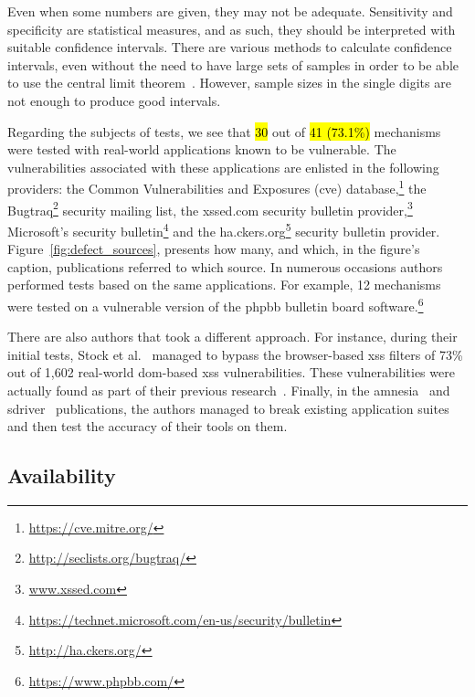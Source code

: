\documentclass[10pt,journal,compsoc]{IEEEtran}
\newcommand{\hlc}[2][yellow]{ {\sethlcolor{#1} \hl{#2}} }
\begin{document}
Even when some numbers are given, they may not be adequate.
Sensitivity and specificity are statistical measures, and as such,
they should be interpreted with suitable confidence intervals. There are
various methods to calculate confidence intervals, even without
the need to have large sets of samples in order to be able to use the
central limit theorem~\cite{brown2001}.
However, sample sizes in the single
digits are not enough to produce good intervals.

Regarding the subjects of tests,
we see that \hlc[yellow]{30} out of \hlc[yellow]{41 (73.1\%)}
mechanisms were tested with real-world
applications known to be vulnerable.
The vulnerabilities associated with these applications
are enlisted in the following providers: the Common
Vulnerabilities and Exposures ({\sc cve})
database,\footnote{\scriptsize\url{https://cve.mitre.org/}}
the Bugtraq\footnote{\scriptsize\url{http://seclists.org/bugtraq/}}
security mailing list,
the {\sc xss}ed.com
security bulletin provider,\footnote{\scriptsize\url{www.xssed.com}}
Microsoft's security
bulletin\footnote{\scriptsize\url{https://technet.microsoft.com/en-us/security/bulletin}}
and the
ha.ckers.org\footnote{\scriptsize\url{http://ha.ckers.org/}}
security bulletin provider.
Figure~\ref{fig:defect_sources},
presents how many,
and which, in the figure's caption, publications referred
to which source.
In numerous occasions authors performed tests based
on the same applications.
For example, 12 mechanisms were tested on a
vulnerable version of the {\sc phpbb} bulletin board
software.\footnote{\scriptsize\url{https://www.phpbb.com/}}

There are also authors that took a different approach.
For instance, during their initial tests,
Stock et al.~\cite{SLMS14} managed to bypass
the browser-based {\sc xss} filters of
73\% out of 1,602 real-world {\sc dom}-based {\sc xss} vulnerabilities.
These vulnerabilities were actually found as part of
their previous research~\cite{LSJ13}.
Finally, in the {\sc amnesia}~\cite{HO05b} and
{\sc sd}river~\cite{MS09} publications,
the authors managed to break existing application suites
and then test the accuracy of their tools on them.

\subsection{Availability}
\end{document}

